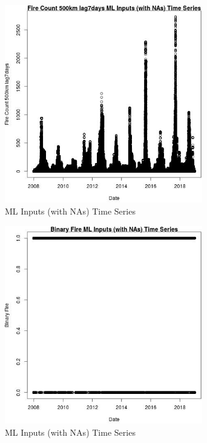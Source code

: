 \begin{figure} 
\centering  
\includegraphics[width=0.77\textwidth]{Code_Outputs/Report_ML_input_PM25_Step4_part_f_de_duplicated_aves_prioritize_24hr_obswNAs_Fire_Count_500km_lag7daysvDate.jpg} 
\caption{\label{fig:Report_ML_input_PM25_Step4_part_f_de_duplicated_aves_prioritize_24hr_obswNAsFire_Count_500km_lag7daysvDate}ML Inputs (with NAs) Time Series} 
\end{figure} 
 

\clearpage 

\begin{figure} 
\centering  
\includegraphics[width=0.77\textwidth]{Code_Outputs/Report_ML_input_PM25_Step4_part_f_de_duplicated_aves_prioritize_24hr_obswNAs_Binary_FirevDate.jpg} 
\caption{\label{fig:Report_ML_input_PM25_Step4_part_f_de_duplicated_aves_prioritize_24hr_obswNAsBinary_FirevDate}ML Inputs (with NAs) Time Series} 
\end{figure} 
 

